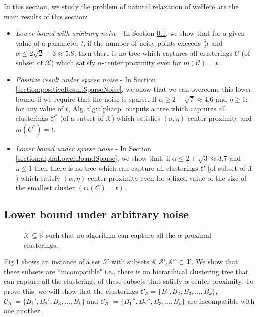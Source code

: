 \documentclass[anon,12pt]{colt2016} %
\newcommand{\mc}{\mathcal}
\begin{document}
In this section, we study the problem of natural relaxation of weHere are the main results of this section:

\begin{itemize}
\item {\it Lower bound with arbitrary noise} - In Section \ref{section:alphaLowerBoundArbitrary}, we show that for a given value of a parameter $t$, if the number of noisy points exceeds $\frac{3}{2}t$ and $\alpha \le 2\sqrt{2} + 3 \approx 5.8$, then there is no tree which captures all clusterings $\mc C$ (of subset of $\mc X$) which satisfy $\alpha$-center proximity even for $m(\mc C) = t$.
\item  {\it Positive result under sparse noise} - In Section \ref{section:positiveResultSparseNoise}, we show that we can overcome this lower bound if we require that the noise is sparse. If $\alpha \ge 2 + \sqrt{7} \approx 4.6$ and $\eta \ge 1$; for any value of $t$, Alg.\ref{alg:alphacp} outputs a tree which captures all clusterings $\mc C^*$ (of a subset of $\mc X$) which satisfies $(\alpha, \eta)$-center proximity and $m(C^*)=t$.
\item  {\it Lower bound under sparse noise} - In Section \ref{section:alphaLowerBoundSparse}, we show that, if $\alpha \le 2 + \sqrt{3} \approx 3.7$ and $\eta \le 1$ then there is no tree which can capture all clusterings $\mc C$ (of subset of $\mc X$) which satisfy $(\alpha, \eta)$-center proximity even for a fixed value of the size of the smallest cluster $(m(C) = t)$.
\end{itemize} 


\subsection{Lower bound under arbitrary noise}
\label{section:alphaLowerBoundArbitrary}

\begin{figure}

\caption{$\mc X \subseteq \mathbb{R}$ such that no algorithm can capture all the $\alpha$-proximal clusterings. } 
\label{fig:nosparsealg}
\end{figure}

Fig.\ref{fig:nosparsealg} shows an instance of a set $\mc X$ with subsets $\mc S, \mc S', \mc S'' \subset \mc X$. We show that these subsets are ``incompatible" i.e., there is no  hierarchical clustering tree that can capture all the clusterings of these subsets that satisfy $\alpha$-center proximity. To prove this, we will show that the clusterings $\mc C_{\mc S} = \{B_1, B_2, B_3, \ldots, B_k\}$, $\mc C_{\mc S'} = \{B_1', B_2', B_3, \ldots, B_k\}$ and $\mc C_{\mc S''} = \{B_1'', B_2'', B_3, \ldots, B_k\}$ are incompatible with one another.
\end{document}
